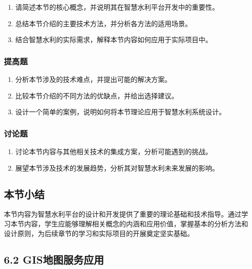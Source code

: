 \begin{enumerate}
\def\labelenumi{\arabic{enumi}.}
\tightlist
\item
  请简述本节的核心概念，并说明其在智慧水利平台开发中的重要性。
\item
  总结本节介绍的主要技术方法，并分析各方法的适用场景。
\item
  结合智慧水利的实际需求，解释本节内容如何应用于实际项目中。
\end{enumerate}

\hypertarget{ux63d0ux9ad8ux9898-2}{%
\subsubsection{提高题}\label{ux63d0ux9ad8ux9898-2}}

\begin{enumerate}
\def\labelenumi{\arabic{enumi}.}
\tightlist
\item
  分析本节涉及的技术难点，并提出可能的解决方案。
\item
  比较本节介绍的不同方法的优缺点，并给出选择建议。
\item
  设计一个简单的案例，说明如何将本节理论应用于智慧水利系统设计。
\end{enumerate}

\hypertarget{ux8ba8ux8bbaux9898-2}{%
\subsubsection{讨论题}\label{ux8ba8ux8bbaux9898-2}}

\begin{enumerate}
\def\labelenumi{\arabic{enumi}.}
\tightlist
\item
  讨论本节内容与其他相关技术的集成方案，分析可能遇到的挑战。
\item
  展望本节涉及技术的发展趋势，分析其对智慧水利未来发展的影响。
\end{enumerate}

\hypertarget{ux672cux8282ux5c0fux7ed3-1}{%
\subsection{本节小结}\label{ux672cux8282ux5c0fux7ed3-1}}

本节内容为智慧水利平台的设计和开发提供了重要的理论基础和技术指导。通过学习本节内容，学生应能够理解相关概念的内涵和应用价值，掌握基本的分析方法和设计原则，为后续章节的学习和实际项目的开展奠定坚实基础。

\hypertarget{gisux5730ux56feux670dux52a1ux5e94ux7528}{%
\subsection{6.2 GIS地图服务应用}\label{gisux5730ux56feux670dux52a1ux5e94ux7528}}

